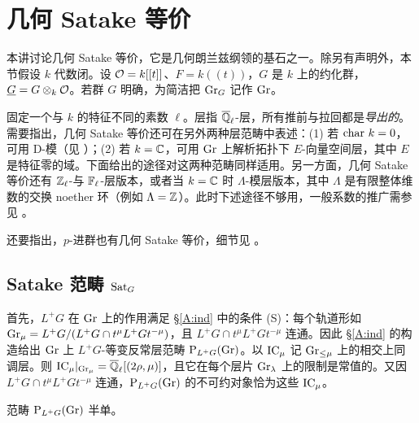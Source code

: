 
\section{几何 Satake 等价}\label{Lecture V}

本讲讨论几何 Satake 等价，它是几何朗兰兹纲领的基石之一。除另有声明外，本节假设 $k$ 代数闭。设 ${\mathcal O}=k[[t]]$、$F=k((t))$，$G$ 是 $k$ 上的约化群，$\underline G= G\otimes_k{\mathcal O}$。若群 $G$ 明确，为简洁把 ${\operatorname{Gr}}_G$ 记作 ${\operatorname{Gr}}$。

固定一个与 $k$ 的特征不同的素数 $\ell$。层指 ${\overline{{\mathbb Q}}_\ell}$-层，所有推前与拉回都是\emph{导出的}。需要指出，几何 Satake 等价还可在另外两种层范畴中表述：(1) 若 ${\operatorname{char}}\ k=0$，可用 D-模（见 \cite[\S\ 5.3]{BD}）；(2) 若 $k={\mathbb C}$，可用 ${\operatorname{Gr}}$ 上解析拓扑下 $E$-向量空间层，其中 $E$ 是特征零的域。下面给出的途径对这两种范畴同样适用。另一方面，几何 Satake 等价还有 ${\mathbb Z}_\ell$-与 ${\mathbb F}_\ell$-层版本，或者当 $k={\mathbb C}$ 时 $\Lambda$-模层版本，其中 $\Lambda$ 是有限整体维数的交换 noether 环（例如 $\Lambda={\mathbb Z}$）。此时下述途径不够用，一般系数的推广需参见 \cite{MV}。

还要指出，$p$-进群也有几何 Satake 等价，细节见 \cite{Z14}。

\subsection{Satake 范畴 ${\operatorname{Sat}}_G$}\label{Satake category}

首先，$L^+G$ 在 ${\operatorname{Gr}}$ 上的作用满足 \S\ref{A:ind} 中的条件 (S)：每个轨道形如 ${\operatorname{Gr}}_\mu=L^+G/(L^+G\cap t^{\mu} L^+G t^{-\mu})$，且 $L^+G\cap t^{\mu} L^+G t^{-\mu}$ 连通。因此 \S\ref{A:ind} 的构造给出 ${\operatorname{Gr}}$ 上 $L^+G$-等变反常层范畴 $\operatorname{P}_{L^+G}({\operatorname{Gr}})$。以 ${\operatorname{IC}}_\mu$ 记 ${\operatorname{Gr}}_{\leq \mu}$ 上的相交上同调层。则 ${\operatorname{IC}}_\mu|_{{\operatorname{Gr}}_\mu}={\overline{{\mathbb Q}}_\ell}[(2\rho,\mu)]$，且它在每个层片 ${\operatorname{Gr}}_{\lambda}$ 上的限制是常值的。又因 $L^+G\cap t^{\mu} L^+G t^{-\mu}$ 连通，$\operatorname{P}_{L^+G}({\operatorname{Gr}})$ 的不可约对象恰为这些 $\operatorname{IC}_\mu$。

\begin{prop}\label{semisimplicity}
范畴 $\operatorname{P}_{L^+G}({\operatorname{Gr}})$ 半单。
\end{prop}

